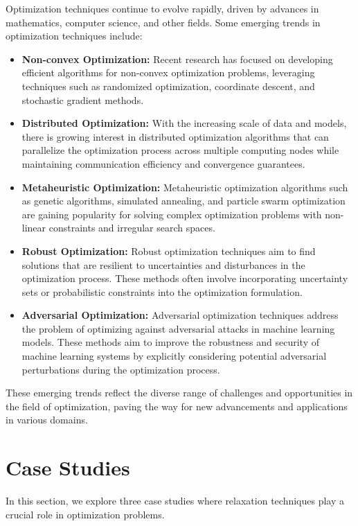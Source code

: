 \documentclass[12pt]{book} %
\begin{document}
Optimization techniques continue to evolve rapidly, driven by advances in mathematics, computer science, and other fields. Some emerging trends in optimization techniques include:

\begin{itemize}
    \item \textbf{Non-convex Optimization:} Recent research has focused on developing efficient algorithms for non-convex optimization problems, leveraging techniques such as randomized optimization, coordinate descent, and stochastic gradient methods.
    
    \item \textbf{Distributed Optimization:} With the increasing scale of data and models, there is growing interest in distributed optimization algorithms that can parallelize the optimization process across multiple computing nodes while maintaining communication efficiency and convergence guarantees.
    
    \item \textbf{Metaheuristic Optimization:} Metaheuristic optimization algorithms such as genetic algorithms, simulated annealing, and particle swarm optimization are gaining popularity for solving complex optimization problems with non-linear constraints and irregular search spaces.
    
    \item \textbf{Robust Optimization:} Robust optimization techniques aim to find solutions that are resilient to uncertainties and disturbances in the optimization process. These methods often involve incorporating uncertainty sets or probabilistic constraints into the optimization formulation.
    
    \item \textbf{Adversarial Optimization:} Adversarial optimization techniques address the problem of optimizing against adversarial attacks in machine learning models. These methods aim to improve the robustness and security of machine learning systems by explicitly considering potential adversarial perturbations during the optimization process.
\end{itemize}

These emerging trends reflect the diverse range of challenges and opportunities in the field of optimization, paving the way for new advancements and applications in various domains.


\section{Case Studies}
In this section, we explore three case studies where relaxation techniques play a crucial role in optimization problems.
\end{document}
